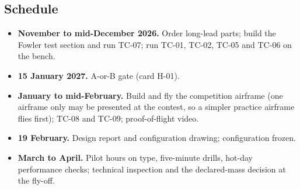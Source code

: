 \subsection{Schedule}
\begin{itemize}
\item \textbf{November to mid-December 2026.} Order long-lead parts; build the Fowler test section and run TC-07; run TC-01, TC-02, TC-05 and TC-06 on the bench.
\item \textbf{15 January 2027.} A-or-B gate (card H-01).
\item \textbf{January to mid-February.} Build and fly the competition airframe (one airframe only may be presented at the contest, so a simpler practice airframe flies first); TC-08 and TC-09; proof-of-flight video.
\item \textbf{19 February.} Design report and configuration drawing; configuration frozen.
\item \textbf{March to April.} Pilot hours on type, five-minute drills, hot-day performance checks; technical inspection and the declared-mass decision at the fly-off.
\end{itemize}
